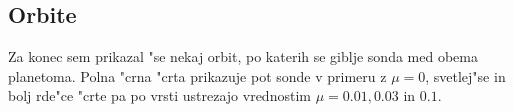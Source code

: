 \documentclass[a4paper,10pt]{article}
\begin{document}
\begin{comment}
\begin{figure}[H]
\centering
 
 \caption{Skupna sprememba hitrosti, potrebna za doseg drugega planeta in varno zaustavitev, pri faznih zamikih $\delta$ in pri relativni masi planetov $\mu=0,\!1$}
 \label{fig:hitrost-delta-10}
\end{figure}


Poleg pri"cakovanega nara"s"canja ube"zne hitrosti z ve"canjem $\mu$ opazimo tudi, da grafi postajajo vse manj periodi"cni, vrhovi pa vse manj izraziti. Mo"cnej"sa privla"cna sila planetov o"citno dovoljuje orbite, ki niso ve"c elipti"cne, ampak so zaradi vpliva planetov popa"cene in nimajo stalne periode. 

Ena"cbe uporabljenih ogrinja"c, ki sem jih dobil s prilagajanjem funkcije $f(x) = a+b/\sqrt{x}$ najni"zjim to"ckam na grafu, so navedene v tabeli \ref{tab:ogrinjace}. Ta funkcija se je izkalaza kot dober pribli"zek pri razli"cnih vrednostih $\mu$, "ceprav ima le dva parametra. Vidimo, da se parameter $a$ le malo spreminja z maso planetov, medtem ko $b$ mo"cno nara"s"ca. V splo"snem potrebna sprememba hitrosti z maso planetov nara"s"ca, k "ceme pripomore predvsem pove"canje ube"zne hitrosti. 

\begin{table}[H]
\centering
\begin{tabular}{|l|l|}
\hline
 $\mu$ & Ena"cba ogrinja"ce \\
 \hline
 0,0 & $1,\!33 - 2,\!81/\sqrt{T}$ \\
 \hline
 0,001 & 1,08 \\
 0,01 & $0,\!94 + 4,\!35/\sqrt{T}$ \\
 0,02 & $1,\!07 + 5,\!64/\sqrt{T}$ \\
 0,1 & $1,\!26 + 11,\!9/\sqrt{T}$ \\
 \hline
\end{tabular}
\caption{Ena"cbe prilagojenih ogrinja"c pri razli"cnih masah planetov}
\label{tab:ogrinjace}
\end{table}

\end{comment}

\subsection{Orbite}

Za konec sem prikazal "se nekaj orbit, po katerih se giblje sonda med obema planetoma. Polna "crna "crta prikazuje pot sonde v primeru z $\mu=0$, svetlej"se in bolj rde"ce "crte pa po vrsti ustrezajo vrednostim $\mu = 0.01, 0.03$ in $0.1$. 
\end{document}
